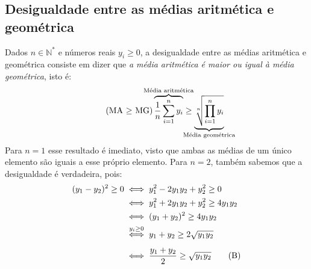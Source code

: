 \subsection*{Desigualdade entre as médias aritmética e geométrica}

Dados $n \in \mathds{N}^*$ e números reais $y_i \ge 0$,
a desigualdade entre as médias aritmética e geométrica
consiste em dizer que
\emph{a média aritmética é maior ou igual à média geométrica}, isto é:
\[\tag{MA $\ge$ MG}
    \overbrace{
      \dfrac{1}{n} \sum_{i=1}^n y_i
    }^{\mathclap{\text{Média aritmética}}}
  \ge
    \underbrace{
      \sqrt[n]{\prod_{i=1}^n y_i}
    }_{\mathclap{\text{Média geométrica}}}
\]
Para $n = 1$ esse resultado é imediato,
visto que ambas as médias de um único elemento
são iguais a esse próprio elemento.
Para $n = 2$, também sabemos que a desigualdade é verdadeira, pois:
\begin{align*}
    (y_1 - y_2)^2 \ge 0
  &\iff
    y_1^2 - 2 y_1 y_2 + y_2^2 \ge 0
  \\&\iff
    y_1^2 + 2 y_1 y_2 + y_2^2 \ge 4 y_1 y_2
  \\&\iff
    (y_1 + y_2)^2 \ge 4 y_1 y_2
  \\&\stackrel{\rule[-.3em]{0pt}{0pt}y_i \ge 0}{\iff}\vphantom{\int}
    y_1 + y_2 \ge 2 \sqrt{y_1 y_2}
  \\&\iff
    \dfrac{y_1 + y_2}{2} \ge \sqrt{y_1 y_2}
  \tag{B}
\end{align*}

